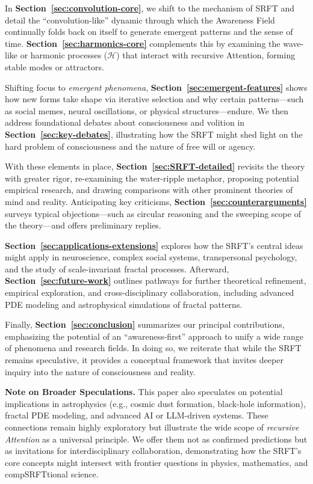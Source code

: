 \documentclass[12pt,a4paper]{article}
\begin{document}
In \textbf{Section~\ref{sec:convolution-core}}, we shift to the mechanism of SRFT and detail the “convolution-like” dynamic through which the Awareness Field continually folds back on itself to generate emergent patterns and the sense of time. \textbf{Section~\ref{sec:harmonics-core}} complements this by examining the wave-like or harmonic processes (\(\mathcal{H}\)) that interact with recursive Attention, forming stable modes or attractors.

Shifting focus to \emph{emergent phenomena}, \textbf{Section~\ref{sec:emergent-features}} shows how new forms take shape via iterative selection and why certain patterns—such as social memes, neural oscillations, or physical structures—endure. We then address foundational debates about consciousness and volition in \textbf{Section~\ref{sec:key-debates}}, illustrating how the SRFT might shed light on the hard problem of consciousness and the nature of free will or agency.

With these elements in place, \textbf{Section~\ref{sec:SRFT-detailed}} revisits the theory with greater rigor, re-examining the water-ripple metaphor, proposing potential empirical research, and drawing comparisons with other prominent theories of mind and reality. Anticipating key criticisms, \textbf{Section~\ref{sec:counterarguments}} surveys typical objections—such as circular reasoning and the sweeping scope of the theory—and offers preliminary replies.

\textbf{Section~\ref{sec:applications-extensions}} explores how the SRFT’s central ideas might apply in neuroscience, complex social systems, transpersonal psychology, and the study of scale-invariant fractal processes. Afterward, \textbf{Section~\ref{sec:future-work}} outlines pathways for further theoretical refinement, empirical exploration, and cross-disciplinary collaboration, including advanced PDE modeling and astrophysical simulations of fractal patterns.

Finally, \textbf{Section~\ref{sec:conclusion}} summarizes our  principal contributions, emphasizing the potential of an “awareness-first” approach to unify a wide range of phenomena and research fields. In doing so, we reiterate that while the SRFT remains speculative, it provides a conceptual framework that invites deeper inquiry into the nature of consciousness and reality.

\medskip
\noindent
\textbf{Note on Broader Speculations.} 
This paper also speculates on potential implications in astrophysics (e.g., cosmic dust formation, black-hole information), fractal PDE modeling, and advanced AI or LLM-driven systems. These connections remain highly exploratory but illustrate the wide scope of \emph{recursive Attention} as a universal principle. We offer them not as confirmed predictions but as invitations for interdisciplinary collaboration, demonstrating how the SRFT’s core concepts might intersect with frontier questions in physics, mathematics, and compSRFTtional science.
\medskip
\end{document}
